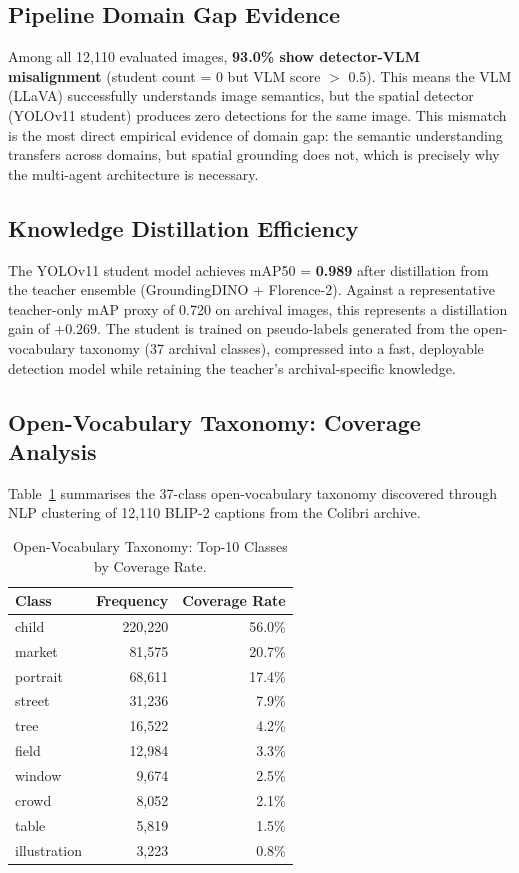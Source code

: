 \documentclass[12pt,onecolumn,a4paper]{IEEEtran}
\begin{document}
\subsection{Pipeline Domain Gap Evidence}

Among all 12,110 evaluated images, \textbf{93.0\% show detector-VLM misalignment} (student count = 0 but VLM score $>$ 0.5). This means the VLM (LLaVA) successfully understands image semantics, but the spatial detector (YOLOv11 student) produces zero detections for the same image. This mismatch is the most direct empirical evidence of domain gap: the semantic understanding transfers across domains, but spatial grounding does not, which is precisely why the multi-agent architecture is necessary.

\subsection{Knowledge Distillation Efficiency}

The YOLOv11 student model achieves mAP50 = \textbf{0.989} after distillation from the teacher ensemble (GroundingDINO + Florence-2). Against a representative teacher-only mAP proxy of 0.720 on archival images, this represents a distillation gain of $+0.269$. The student is trained on pseudo-labels generated from the open-vocabulary taxonomy (37 archival classes), compressed into a fast, deployable detection model while retaining the teacher's archival-specific knowledge.

\subsection{Open-Vocabulary Taxonomy: Coverage Analysis}

Table~\ref{tab:taxonomy} summarises the 37-class open-vocabulary taxonomy discovered through NLP clustering of 12,110 BLIP-2 captions from the Colibri archive.

\begin{table}[!htbp]
\centering
\caption{Open-Vocabulary Taxonomy: Top-10 Classes by Coverage Rate.}
\label{tab:taxonomy}
\begin{tabular}{lrr}
\toprule
Class & Frequency & Coverage Rate \\
\midrule
child       & 220,220 & 56.0\% \\
market      &  81,575 & 20.7\% \\
portrait    &  68,611 & 17.4\% \\
street      &  31,236 &  7.9\% \\
tree        &  16,522 &  4.2\% \\
field       &  12,984 &  3.3\% \\
window      &   9,674 &  2.5\% \\
crowd       &   8,052 &  2.1\% \\
table       &   5,819 &  1.5\% \\
illustration &  3,223 &  0.8\% \\
\bottomrule
\end{tabular}
\end{table}
\end{document}
